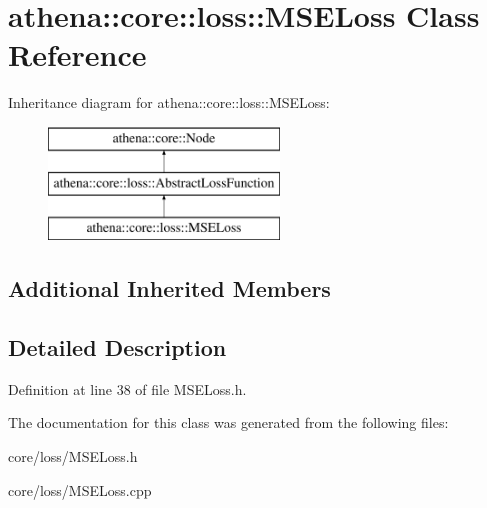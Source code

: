 \hypertarget{classathena_1_1core_1_1loss_1_1_m_s_e_loss}{}\section{athena\+:\+:core\+:\+:loss\+:\+:M\+S\+E\+Loss Class Reference}
\label{classathena_1_1core_1_1loss_1_1_m_s_e_loss}
Inheritance diagram for athena\+:\+:core\+:\+:loss\+:\+:M\+S\+E\+Loss\+:\begin{figure}[H]
\begin{center}
\leavevmode
\includegraphics[height=3.000000cm]{dc/d9a/classathena_1_1core_1_1loss_1_1_m_s_e_loss}
\end{center}
\end{figure}
\subsection*{Additional Inherited Members}


\subsection{Detailed Description}


Definition at line 38 of file M\+S\+E\+Loss.\+h.



The documentation for this class was generated from the following files\+:\begin{DoxyCompactItemize}
\item 
core/loss/M\+S\+E\+Loss.\+h\item 
core/loss/M\+S\+E\+Loss.\+cpp\end{DoxyCompactItemize}
